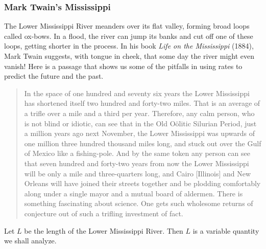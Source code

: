 \subsubsection{Mark Twain's Mississippi}
\label{subsubsec:mark-twains-mississippi}

The Lower Mississippi River meanders over its flat valley, forming
broad loops called ox-bows. In a flood, the river can
jump its banks and cut off one of these loops, getting shorter in the
process.  In his book {\em Life on the Mississippi} (1884), Mark
Twain suggests, with tongue in cheek, that some day
the river might even vanish!  Here is a passage that shows us some of
the pitfalls in using rates to predict the future and the past.
\begin{quote}\label{`twain'}
{\small In the space of one hundred and seventy six years the Lower
  Mississippi has shortened itself two hundred and forty-two miles.
  That is an average of a trifle over a mile and a third per year.
  Therefore, any calm person, who is not blind or idiotic, can see
  that in the Old O\"{o}litic Silurian Period, just a million years
  ago next November, the Lower Mississippi was upwards of one million
  three hundred thousand miles long, and stuck out over the Gulf of
  Mexico like a fishing-pole.  And by the same token any person can
  see that seven hundred and forty-two years from now the Lower
  Mississippi will be only a mile and three-quarters long, and Cairo
  [Illinois] and New Orleans will have joined their streets together
  and be plodding comfortably along under a single mayor and a mutual
  board of aldermen.  There is something fascinating about science.
  One gets such wholesome returns of conjecture out of such a trifling
  investment of fact.}
\end{quote}


Let $L$ be the length of the Lower Mississippi River.  Then $L$ is a
variable quantity we shall analyze.


